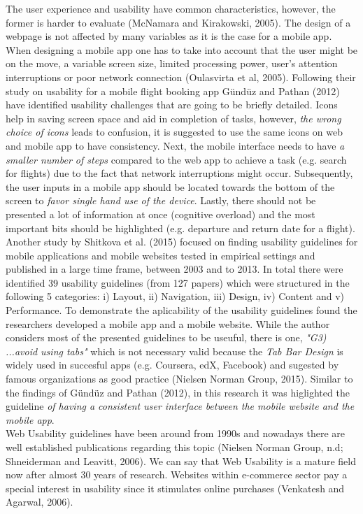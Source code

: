 \documentclass[version=last,fontsize=13pt]{scrartcl}
\begin{document}
The user experience and usability have common characteristics, however, the former is harder to evaluate (McNamara and Kirakowski, 2005).
The design of a webpage is not affected by many variables as it is the case for a mobile app. When designing a mobile app one has to take into account that the user might be on the move, a variable screen size, limited processing power, user's attention interruptions or poor network connection (Oulasvirta et al, 2005). Following their study on usability for a mobile flight booking app Gündüz and Pathan (2012) have identified  usability challenges that are going to be briefly detailed. Icons help in saving screen space and aid in completion of tasks, however, \textit{the wrong choice of icons} leads to confusion, it is suggested to use the same icons on web and mobile app to have consistency. Next, the mobile interface needs  to have \textit{a smaller number of steps} compared to the web app to achieve a task (e.g. search for flights) due to the fact that network interruptions might occur. Subsequently, the user inputs in a mobile app should be located towards the bottom of the screen to \textit{favor single hand use of the device}. Lastly,  there should not be presented a lot of information at once (cognitive overload) and the most important bits should be highlighted (e.g. departure and return date for a flight).\\
\indent
	Another study by Shitkova et al. (2015) focused on finding usability guidelines for mobile applications and mobile websites tested in empirical settings and published in a large time frame, between 2003 and to 2013. In total there were identified 39 usability guidelines (from 127 papers) which were structured in the following 5 categories: i) Layout, ii) Navigation, iii) Design, iv) Content and v) Performance. To demonstrate the aplicability of the usability guidelines found the researchers developed a mobile app and a mobile website. While the author considers most of the presented guidelines to be useuful, there is one, \textit{"G3) ...avoid using tabs"} which is not necessary valid because the \textit{Tab Bar Design} is widely used in succesful apps (e.g. Coursera, edX, Facebook) and sugested by famous organizations as good practice (Nielsen Norman Group, 2015).  Similar to the findings of Gündüz and Pathan (2012), in this research it was higlighted the guideline \textit{of having a consistent user interface between the mobile website and the mobile app}.\\

\indent
Web Usability guidelines have been around from 1990s and nowadays there are well established publications regarding this topic (Nielsen Norman Group, n.d; Shneiderman and Leavitt, 2006). We can say that Web Usability is a mature field now after almost 30 years of research. Websites within e-commerce sector pay a special interest in usability since it stimulates online purchases (Venkatesh and Agarwal, 2006).
\end{document}
